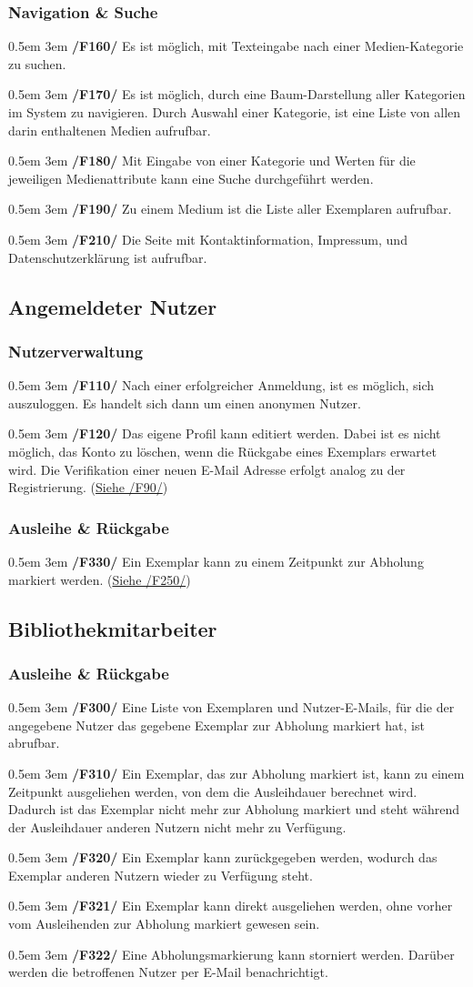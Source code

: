 \documentclass{article}
\newcommand{\specification}[3]{
	{\parindent 0.5em \hangindent 3em \hypertarget{spec:#1:#2}{\textbf{/#1#2/}} #3 \par \nobreak \vspace*{0.5em}}
}
\begin{document}
	\subsubsection{Navigation \& Suche}
		\specification{F}{160}{Es ist möglich, mit Texteingabe nach einer Medien-Kategorie zu suchen. }
		\specification{F}{170}{Es ist möglich, durch eine Baum-Darstellung aller Kategorien im System zu navigieren. Durch Auswahl einer Kategorie, ist eine Liste von allen darin enthaltenen Medien aufrufbar. }
		\specification{F}{180}{Mit Eingabe von einer Kategorie und Werten für die jeweiligen Medienattribute kann eine Suche durchgeführt werden. }
		\specification{F}{190}{Zu einem Medium ist die Liste aller Exemplaren aufrufbar. }
		\specification{F}{210}{Die Seite mit Kontaktinformation, Impressum, und Datenschutzerklärung ist aufrufbar. }
\subsection{Angemeldeter Nutzer}
	\subsubsection{Nutzerverwaltung}
		\specification{F}{110}{Nach einer erfolgreicher Anmeldung, ist es möglich, sich auszuloggen. Es handelt sich dann um einen anonymen Nutzer. }
		\specification{F}{120}{Das eigene Profil kann editiert werden. Dabei ist es nicht möglich, das Konto zu löschen, wenn die Rückgabe eines Exemplars erwartet wird.
			Die Verifikation einer neuen E-Mail Adresse erfolgt analog zu der Registrierung. (\hyperlink{spec:F:90}{Siehe /F90/}) }
	\subsubsection{Ausleihe \& Rückgabe}
		\specification{F}{330}{Ein Exemplar kann zu einem Zeitpunkt zur Abholung markiert werden. (\hyperlink{spec:F:250}{Siehe /F250/}) }
\subsection{Bibliothekmitarbeiter}
	\subsubsection{Ausleihe \& Rückgabe}
		\specification{F}{300}{Eine Liste von Exemplaren und Nutzer-E-Mails, für die der angegebene Nutzer das gegebene Exemplar zur Abholung markiert hat, ist abrufbar. }
		\specification{F}{310}{Ein Exemplar, das zur Abholung markiert ist, kann zu einem Zeitpunkt ausgeliehen werden, von dem die Ausleihdauer berechnet wird.
			Dadurch ist das Exemplar nicht mehr zur Abholung markiert und steht während der Ausleihdauer anderen Nutzern nicht mehr zu Verfügung. }
		\specification{F}{320}{Ein Exemplar kann zurückgegeben werden, wodurch das Exemplar anderen Nutzern wieder zu Verfügung steht. }
		\specification{F}{321}{Ein Exemplar kann direkt ausgeliehen werden, ohne vorher vom Ausleihenden zur Abholung markiert gewesen sein. }
		\specification{F}{322}{Eine Abholungsmarkierung kann storniert werden. Darüber werden die betroffenen Nutzer per E-Mail benachrichtigt. }
\end{document}
